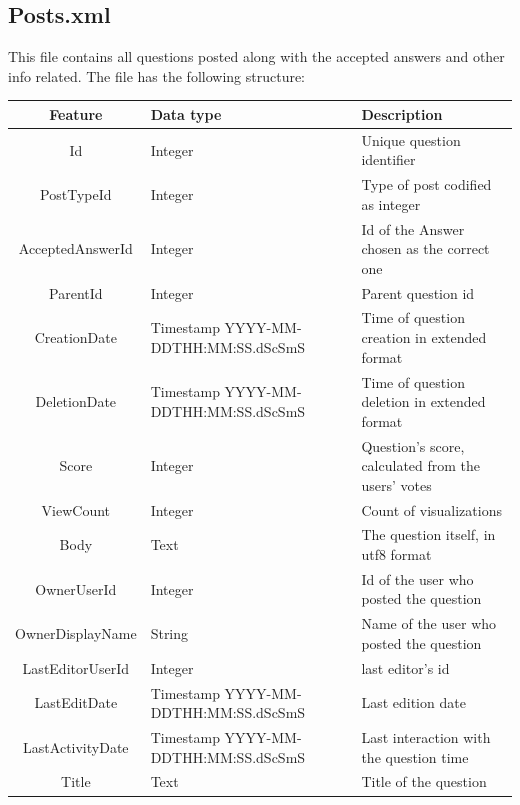 \documentclass[11pt]{book} %
\begin{document}
\newpage

    \subsection{Posts.xml}

      This file contains all questions posted along with the accepted answers and other info related. The file has the following structure:

      \begin{table}[!ht]
        \centering
        \begin{tabular}{|c|p{}|p{}|}
          \hline

          Feature & Data type & Description \\ \hline
          Id & Integer & Unique question identifier \\ \hline
          PostTypeId & Integer & Type of post codified as integer \\ \hline
          AcceptedAnswerId & Integer & Id of the Answer chosen as the correct one \\ \hline
          ParentId & Integer & Parent question id\\ \hline
          CreationDate & Timestamp YYYY-MM-DDTHH:MM:SS.dScSmS & Time of question creation in extended format \\ \hline
          DeletionDate & Timestamp YYYY-MM-DDTHH:MM:SS.dScSmS & Time of question deletion in extended format \\ \hline
          Score & Integer & Question's score, calculated from the users' votes \\ \hline
          ViewCount & Integer & Count of visualizations \\ \hline
          Body & Text & The question itself, in utf8 format \\ \hline
          OwnerUserId & Integer & Id of the user who posted the question \\ \hline
          OwnerDisplayName & String & Name of the user who posted the question \\ \hline
          LastEditorUserId & Integer & last editor's id\\ \hline
          LastEditDate & Timestamp YYYY-MM-DDTHH:MM:SS.dScSmS & Last edition date \\ \hline
          LastActivityDate & Timestamp YYYY-MM-DDTHH:MM:SS.dScSmS & Last interaction with the question time \\ \hline
          Title & Text & Title of the question \\ \hline

\end{tabular}
\end{table}
\end{document}
